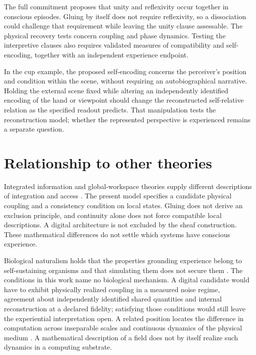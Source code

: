 \documentclass{article}
\renewcommand{\cite}[1]{\citep{#1}}
\begin{document}
The full commitment proposes that unity and reflexivity occur together in conscious episodes. Gluing by itself does not require reflexivity, so a dissociation could challenge that requirement while leaving the unity clause assessable. The physical recovery tests concern coupling and phase dynamics. Testing the interpretive clauses also requires validated measures of compatibility and self-encoding, together with an independent experience endpoint.

In the cup example, the proposed self-encoding concerns the perceiver's
position and condition within the scene, without requiring an autobiographical
narrative. Holding the external scene fixed while altering an independently
identified encoding of the hand or viewpoint should change the reconstructed
self-relative relation as the specified readout predicts. That manipulation
tests the reconstruction model; whether the represented perspective is
experienced remains a separate question.

\section{Relationship to other theories}
\label{sec:supp-other-theories}

Integrated information and global-workspace theories supply different descriptions of integration and access \cite{tononi2016,baars1997,dehaene2014}. The present model specifies a candidate physical coupling and a consistency condition on local states. Gluing does not derive an exclusion principle, and continuity alone does not force compatible local descriptions. A digital architecture is not excluded by the sheaf construction. These mathematical differences do not settle which systems have conscious experience.

Biological naturalism holds that the properties grounding experience belong to self-sustaining organisms and that simulating them does not secure them \cite{seth2026,seth2026response}. The conditions in this work name no biological mechanism. A digital candidate would have to exhibit physically realized coupling in a measured noise regime, agreement about independently identified shared quantities and internal reconstruction at a declared fidelity; satisfying those conditions would still leave the experiential interpretation open. A related position locates the difference in computation across inseparable scales and continuous dynamics of the physical medium \cite{milinkovic2026}. A mathematical description of a field does not by itself realize such dynamics in a computing substrate.
\end{document}
